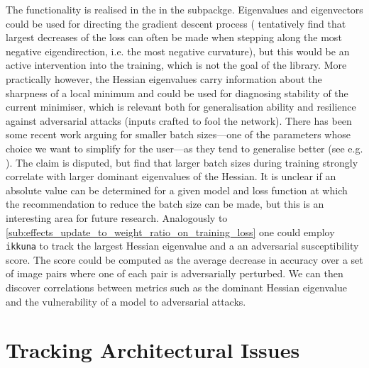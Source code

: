 The functionality is realised in the  in the
 subpackge. Eigenvalues and eigenvectors could
be used for directing the gradient descent process (\citet{alain2018negative}
tentatively find that largest decreases of the loss can often be made when
stepping along the most negative eigendirection, i.e. the most negative
curvature), but this would be an active intervention into the training, which is
not the goal of the library. More practically however, the Hessian eigenvalues
carry information about the sharpness of a local minimum and could be used for
diagnosing stability of the current minimiser, which is relevant both for
generalisation ability and resilience against adversarial attacks (inputs
crafted to fool the network). There has been some recent work arguing for
smaller batch sizes---one of the parameters whose choice we want to simplify
for the user---as they tend to generalise better (see e.g.
\citep{keskar2016large}). The claim is disputed, but \citet{yao2018hessian} find
that larger batch sizes during training strongly correlate with larger dominant
eigenvalues of the Hessian. It is unclear if an absolute value can be determined
for a given model and loss function at which the recommendation to reduce the
batch size can be made, but this is an interesting area for future research.
Analogously to \cref{sub:effects_update_to_weight_ratio_on_training_loss} one
could employ \texttt{ikkuna} to track the largest Hessian eigenvalue and a an
adversarial susceptibility score. The score could be computed as the average
decrease in accuracy over a set of image pairs where one of each pair is
adversarially perturbed. We can then discover correlations between metrics such
as the dominant Hessian eigenvalue and the vulnerability of a model to
adversarial attacks.


\section{Tracking Architectural Issues}%
\label{sec:tracking_architecture}

